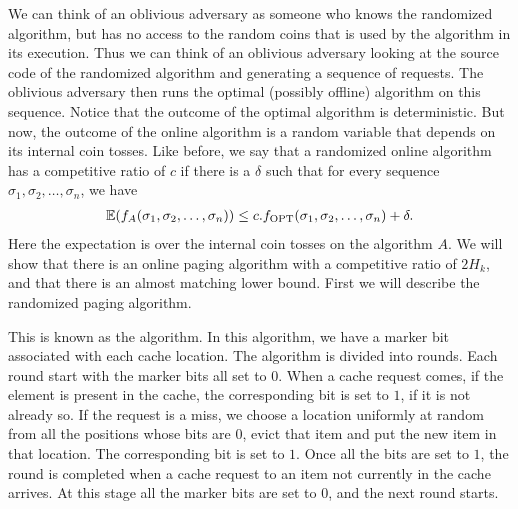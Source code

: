 We can think of an oblivious adversary as someone who knows the randomized algorithm, but has no access to the random coins that is used by the algorithm in its execution. Thus we can think of an oblivious adversary looking at the source code of the randomized algorithm and generating a sequence of requests. The oblivious adversary then runs the optimal (possibly offline) algorithm on this sequence. Notice that the outcome of the optimal algorithm is deterministic. But now, the outcome of the online algorithm is a random variable that depends on its internal coin tosses. Like before, we say that a randomized online algorithm has a competitive ratio of $c$ if there is a $\delta$ such that for every sequence $\sigma_1, \sigma_2, \ldots, \sigma_n$, we have
\begin{align*}
	\mathbb{E}(f_A(\sigma_1,\sigma_2,\ldots,\sigma_n)) \leq c. f_{\operatorname{OPT}}(\sigma_1, \sigma_2, \ldots, \sigma_n) + \delta.
\end{align*}
Here the expectation is over the internal coin tosses on the algorithm $A$. We will show that there is an online paging algorithm with a competitive ratio of $2H_k$, and that there is an almost matching lower bound. First we will describe the randomized paging algorithm.

This is known as the \marker algorithm. In this algorithm, we have a marker bit associated with each cache location. The algorithm is divided into rounds. Each round start with the marker bits all set to $0$. When a cache request comes, if the element is present in the cache, the corresponding bit is set to $1$, if it is not already so. If the request is a miss, we choose a location uniformly at random from all the positions whose bits are $0$, evict that item and put the new item in that location. The corresponding bit is set to $1$. Once all the bits are set to $1$, the round is completed when a cache request to an item not currently in the cache arrives. At this stage all the marker bits are set to $0$, and the next round starts.

